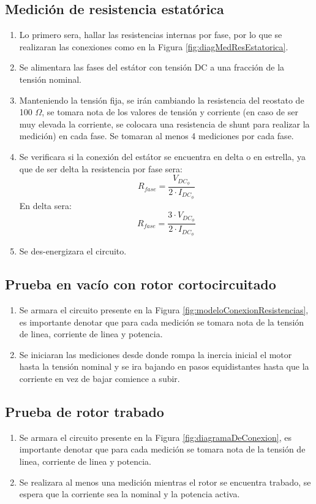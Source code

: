 \documentclass[11pt,letterpaper]{article}     %
\begin{document}
\subsection{Medición de resistencia estatórica}
\begin{enumerate}
	\item Lo primero sera, hallar las resistencias internas por fase, por lo que se realizaran las conexiones como en la Figura \ref{fig:diagMedResEstatorica}.
	\item Se alimentara las fases del estátor con tensión DC a una fracción de la tensión nominal.
	\item Manteniendo la tensión fija, se irán cambiando la resistencia del reostato de 100 $\Omega$, se tomara nota de los valores de tensión y corriente (en caso de ser muy elevada la corriente, se colocara una resistencia de shunt para realizar la medición) en cada fase. Se tomaran al menos 4 mediciones por cada fase.
	\item Se verificara si la conexión del estátor se encuentra en delta o en estrella, ya que de ser delta la resistencia por fase sera:
	\begin{equation}
	R_{fase} = \frac{V_{DC_{\phi}}}{2\cdot I_{DC_{\phi}}}
	\end{equation} 
	En delta sera:
	\begin{equation}
	R_{fase} = \frac{3\cdot V_{DC_{\phi}}}{2\cdot I_{DC_{\phi}}}
	\end{equation} 
	\item Se des-energizara el circuito.
\end{enumerate}
\subsection{Prueba en vacío con rotor cortocircuitado}
\begin{enumerate}
	\item Se armara el circuito presente en la Figura \ref{fig:modeloConexionResistencias}, es importante denotar que para cada medición se tomara nota de la tensión  de linea, corriente de linea y potencia.
	\item Se iniciaran las mediciones desde donde rompa la inercia inicial el motor hasta la tensión nominal y se ira bajando en pasos equidistantes hasta que la corriente en vez de bajar comience a subir.
\end{enumerate}
\subsection{Prueba de rotor trabado}
\begin{enumerate}
	\item Se armara el circuito presente en la Figura \ref{fig:diagramaDeConexion}, es importante denotar que para cada medición se tomara nota de la tensión  de linea, corriente de linea y potencia.
	\item Se realizara al menos una medición mientras el rotor se encuentra trabado, se espera que la corriente sea la nominal y la potencia activa.
\end{enumerate}
\end{document}
